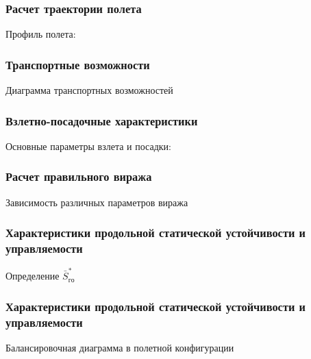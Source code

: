 \documentclass{beamer}
\begin{document}
\begin{frame}[t]
    \frametitle{Расчет траектории полета}
    \begin{center}
        Профиль полета:

        \resizebox{.70\linewidth}{!}{}
    \end{center}
\end{frame}

\begin{frame}[t]
    \frametitle{Транспортные возможности}
    \begin{center}
        Диаграмма транспортных возможностей

        \resizebox{.70\linewidth}{!}{}
    \end{center}
\end{frame}

\begin{frame}[t]
    \frametitle{Взлетно-посадочные характеристики}
    \vfill
    \begin{center}
        Основные параметры взлета и посадки:
        
    \end{center}
    \vfill
\end{frame}

\begin{frame}[t]
    \frametitle{Расчет правильного виража}
    \begin{center}
        Зависимость различных параметров виража
        \resizebox{.70\linewidth}{!}{}
    \end{center}
\end{frame}

\begin{frame}[t]
    \frametitle{Характеристики продольной статической устойчивости и управляемости}
   \begin{center}
       Определение $\bar{S}_{го}^*$ 

       \resizebox{.70\linewidth}{!}{}
   \end{center} 
\end{frame}

\begin{frame}[t]
    \frametitle{Характеристики продольной статической устойчивости и управляемости}
    \begin{center}
        Балансировочная диаграмма в полетной конфигурации 
        \resizebox{.70\linewidth}{!}{}
    \end{center}
\end{frame}
\end{document}
